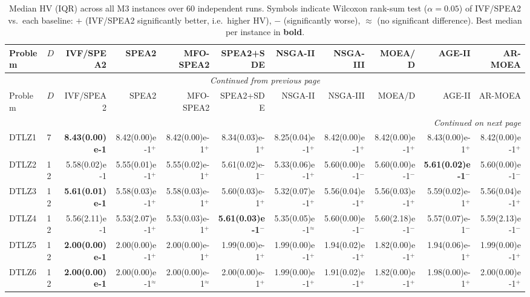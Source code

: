 \begin{longtable}{llrrrrrrrrr}
\caption{Median HV (IQR) across all M3 instances over 60 independent runs. Symbols indicate Wilcoxon rank-sum test ($\alpha=0.05$) of IVF/SPEA2 vs.\ each baseline: $+$ (IVF/SPEA2 significantly better, i.e.\ higher HV), $-$ (significantly worse), $\approx$ (no significant difference). Best median per instance in \textbf{bold}.}
\label{tab:hv_per_instance_m3}\\
\toprule
Problem & $D$ & IVF/SPEA2 & SPEA2 & MFO-SPEA2 & SPEA2+SDE & NSGA-II & NSGA-III & MOEA/D & AGE-II & AR-MOEA \\
\midrule
\endfirsthead
\multicolumn{11}{c}{{\textit{Continued from previous page}}} \\
\toprule
Problem & $D$ & IVF/SPEA2 & SPEA2 & MFO-SPEA2 & SPEA2+SDE & NSGA-II & NSGA-III & MOEA/D & AGE-II & AR-MOEA \\
\midrule
\endhead
\midrule
\multicolumn{11}{r}{{\textit{Continued on next page}}} \\
\endfoot
\botrule
\endlastfoot
DTLZ1 & 7 & \textbf{8.43(0.00)e-1} & 8.42(0.00)e-1$^{+}$ & 8.42(0.00)e-1$^{+}$ & 8.34(0.03)e-1$^{+}$ & 8.25(0.04)e-1$^{+}$ & 8.42(0.00)e-1$^{+}$ & 8.42(0.00)e-1$^{+}$ & 8.43(0.00)e-1$^{+}$ & 8.42(0.00)e-1$^{+}$ \\
DTLZ2 & 12 & 5.58(0.02)e-1 & 5.55(0.01)e-1$^{+}$ & 5.55(0.02)e-1$^{+}$ & 5.61(0.02)e-1$^{-}$ & 5.33(0.06)e-1$^{+}$ & 5.60(0.00)e-1$^{-}$ & 5.60(0.00)e-1$^{-}$ & \textbf{5.61(0.02)e-1}$^{-}$ & 5.60(0.00)e-1$^{-}$ \\
DTLZ3 & 12 & \textbf{5.61(0.01)e-1} & 5.58(0.03)e-1$^{+}$ & 5.58(0.03)e-1$^{+}$ & 5.60(0.03)e-1$^{+}$ & 5.32(0.07)e-1$^{+}$ & 5.56(0.04)e-1$^{+}$ & 5.56(0.03)e-1$^{+}$ & 5.59(0.02)e-1$^{+}$ & 5.56(0.04)e-1$^{+}$ \\
DTLZ4 & 12 & 5.56(2.11)e-1 & 5.53(2.07)e-1$^{+}$ & 5.53(0.03)e-1$^{+}$ & \textbf{5.61(0.03)e-1}$^{-}$ & 5.35(0.05)e-1$^{\approx}$ & 5.60(0.00)e-1$^{-}$ & 5.60(2.18)e-1$^{-}$ & 5.57(0.07)e-1$^{-}$ & 5.59(2.13)e-1$^{-}$ \\
DTLZ5 & 12 & \textbf{2.00(0.00)e-1} & 2.00(0.00)e-1$^{+}$ & 2.00(0.00)e-1$^{+}$ & 1.99(0.00)e-1$^{+}$ & 1.99(0.00)e-1$^{+}$ & 1.94(0.02)e-1$^{+}$ & 1.82(0.00)e-1$^{+}$ & 1.94(0.06)e-1$^{+}$ & 1.99(0.00)e-1$^{+}$ \\
DTLZ6 & 12 & \textbf{2.00(0.00)e-1} & 2.00(0.00)e-1$^{\approx}$ & 2.00(0.00)e-1$^{\approx}$ & 2.00(0.00)e-1$^{+}$ & 1.99(0.00)e-1$^{+}$ & 1.91(0.02)e-1$^{+}$ & 1.82(0.00)e-1$^{+}$ & 1.98(0.00)e-1$^{+}$ & 2.00(0.00)e-1$^{+}$ \\

\end{longtable}
